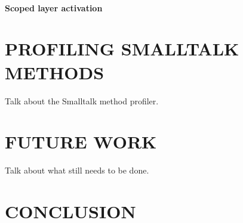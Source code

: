 \documentclass{sig-alternate}
\begin{document}
\paragraph{Scoped layer activation}

\section{PROFILING SMALLTALK METHODS}
Talk about the Smalltalk method profiler.

\section{FUTURE WORK}
Talk about what still needs to be done.

\section{CONCLUSION}
\end{document}
